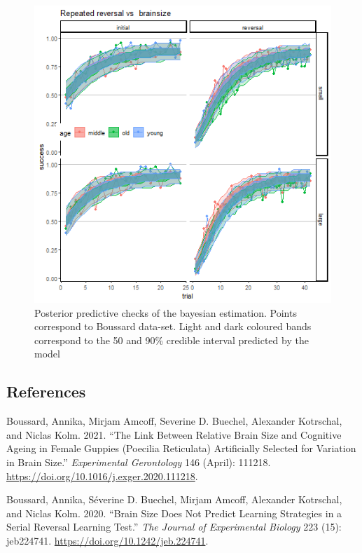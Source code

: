 \documentclass[
]{article}
\newlength{\cslhangindent}
\newlength{\cslentryspacingunit} %
\newenvironment{CSLReferences}[2] %
 {%
  \setlength{\parindent}{0pt}
  \ifodd #1
  \let\oldpar\par
  \def\par{\hangindent=\cslhangindent\oldpar}
  \fi
  \setlength{\parskip}{#2\cslentryspacingunit}
 }%
 {}
\begin{document}
\begin{figure}

\includegraphics[width=6.67in,]{images/boussard2_ppchecks_alpha_tau} \hfill{}

\caption{Posterior predictive checks of the bayesian estimation. Points correspond to Boussard data-set. Light and dark coloured bands correspond to the 50 and 90\% credible interval predicted by the model}\label{fig:unnamed-chunk-19}
\end{figure}

\hypertarget{references}{%
\subsection*{References}\label{references}}

\hypertarget{refs}{}
\begin{CSLReferences}{1}{0}
\leavevmode{}%
Boussard, Annika, Mirjam Amcoff, Severine D. Buechel, Alexander
Kotrschal, and Niclas Kolm. 2021. {``The Link Between Relative Brain
Size and Cognitive Ageing in Female Guppies ({Poecilia} Reticulata)
Artificially Selected for Variation in Brain Size.''} \emph{Experimental
Gerontology} 146 (April): 111218.
\url{https://doi.org/10.1016/j.exger.2020.111218}.

\leavevmode{}%
Boussard, Annika, Séverine D. Buechel, Mirjam Amcoff, Alexander
Kotrschal, and Niclas Kolm. 2020. {``Brain Size Does Not Predict
Learning Strategies in a Serial Reversal Learning Test.''} \emph{The
Journal of Experimental Biology} 223 (15): jeb224741.
\url{https://doi.org/10.1242/jeb.224741}.

\end{CSLReferences}
\end{document}
